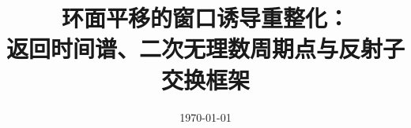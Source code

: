 \documentclass[11pt,letterpaper]{ctexart}
\title{环面平移的窗口诱导重整化：\\\large 返回时间谱、二次无理数周期点与反射子交换框架}
\author{}
\date{\today}
\begin{document}
\maketitle













\FloatBarrier
\appendix





\FloatBarrier

\end{document}
